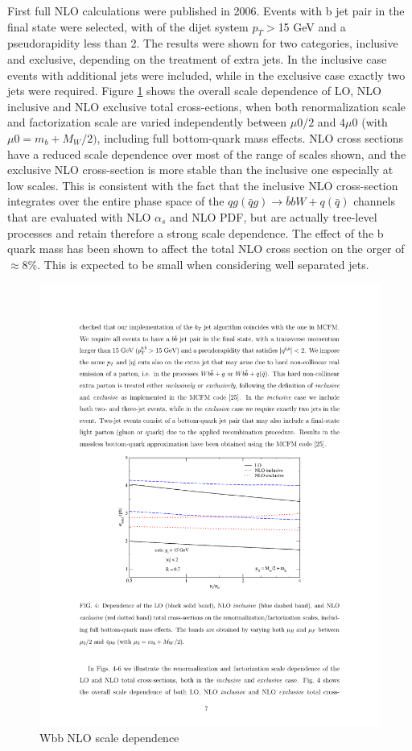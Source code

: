 \par First full NLO calculations were published in 2006\cite{FebresCordero:2006sj}. 
Events with b jet pair in the final state were selected, with of the dijet system $p_T>$15 GeV  and a pseudorapidity less than 2. The results were shown for two categories, inclusive and exclusive, depending on the treatment of extra jets. In the inclusive case events with additional jets were included, while in the exclusive case exactly two jets were required.
Figure \ref{fig:2006_scale} shows the overall scale dependence of LO, NLO inclusive and NLO exclusive total cross-ections, when both renormalization scale and factorization scale are varied independently between $\mu 0/2$ and $4\mu 0$ (with $\mu 0 = m_b + M_W /2)$, including full bottom-quark mass effects. NLO cross sections have a reduced scale dependence over most of the range of scales shown, and the exclusive NLO cross-section is more stable than the inclusive one especially at low scales.
This is consistent with the fact that the inclusive NLO cross-section integrates over the
entire phase space of the $qg(\bar{q}g) \rightarrow \bar{b}bW + q(\bar{q})$ channels that are evaluated with NLO $\alpha_s$ and NLO PDF, but are actually tree-level processes and retain therefore a strong scale
dependence. The effect of the b quark mass has been shown to affect the total NLO cross section on the orger of $\approx 8\%$. This is expected to be small when considering well separated jets.
\begin{figure}[htbp]
	\centering
		\includegraphics{Figures/2006_scale.pdf}
	\caption[Wbb NLO scale dependence]{Wbb NLO scale dependence\cite{FebresCordero:2006sj}}
	\label{fig:2006_scale}
\end{figure}
